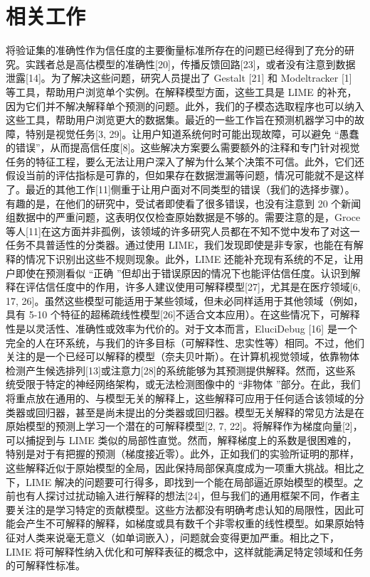 \documentclass[12pt, a4paper]{ctexart} %
\begin{document}
\section{相关工作}
将验证集的准确性作为信任度的主要衡量标准所存在的问题已经得到了充分的研究。实践者总是高估模型的准确性[20]，传播反馈回路[23]，或者没有注意到数据泄露[14]。为了解决这些问题，研究人员提出了 Gestalt [21] 和 Modeltracker [1] 等工具，帮助用户浏览单个实例。在解释模型方面，这些工具是 LIME 的补充，因为它们并不解决解释单个预测的问题。此外，我们的子模态选取程序也可以纳入这些工具，帮助用户浏览更大的数据集。最近的一些工作旨在预测机器学习中的故障，特别是视觉任务[3, 29]。让用户知道系统何时可能出现故障，可以避免 “愚蠢的错误”，从而提高信任度[8]。这些解决方案要么需要额外的注释和专门针对视觉任务的特征工程，要么无法让用户深入了解为什么某个决策不可信。此外，它们还假设当前的评估指标是可靠的，但如果存在数据泄漏等问题，情况可能就不是这样了。最近的其他工作[11]侧重于让用户面对不同类型的错误（我们的选择步骤）。有趣的是，在他们的研究中，受试者即使看了很多错误，也没有注意到 20 个新闻组数据中的严重问题，这表明仅仅检查原始数据是不够的。需要注意的是，Groce 等人[11]在这方面并非孤例，该领域的许多研究人员都在不知不觉中发布了对这一任务不具普适性的分类器。通过使用 LIME，我们发现即使是非专家，也能在有解释的情况下识别出这些不规则现象。此外，LIME 还能补充现有系统的不足，让用户即使在预测看似 “正确 ”但却出于错误原因的情况下也能评估信任度。认识到解释在评估信任度中的作用，许多人建议使用可解释模型[27]，尤其是在医疗领域[6, 17, 26]。虽然这些模型可能适用于某些领域，但未必同样适用于其他领域（例如，具有 5-10 个特征的超稀疏线性模型[26]不适合文本应用）。在这些情况下，可解释性是以灵活性、准确性或效率为代价的。对于文本而言，EluciDebug [16] 是一个完全的人在环系统，与我们的许多目标（可解释性、忠实性等）相同。不过，他们关注的是一个已经可以解释的模型（奈夫贝叶斯）。在计算机视觉领域，依靠物体检测产生候选排列[13]或注意力[28]的系统能够为其预测提供解释。然而，这些系统受限于特定的神经网络架构，或无法检测图像中的 “非物体 ”部分。在此，我们将重点放在通用的、与模型无关的解释上，这些解释可应用于任何适合该领域的分类器或回归器，甚至是尚未提出的分类器或回归器。模型无关解释的常见方法是在原始模型的预测上学习一个潜在的可解释模型[2, 7, 22]。将解释作为梯度向量[2]，可以捕捉到与 LIME 类似的局部性直觉。然而，解释梯度上的系数是很困难的，特别是对于有把握的预测（梯度接近零）。此外，正如我们的实验所证明的那样，这些解释近似于原始模型的全局，因此保持局部保真度成为一项重大挑战。相比之下，LIME 解决的问题要可行得多，即找到一个能在局部逼近原始模型的模型。之前也有人探讨过扰动输入进行解释的想法[24]，但与我们的通用框架不同，作者主要关注的是学习特定的贡献模型。这些方法都没有明确考虑认知的局限性，因此可能会产生不可解释的解释，如梯度或具有数千个非零权重的线性模型。如果原始特征对人类来说毫无意义（如单词嵌入），问题就会变得更加严重。相比之下，LIME 将可解释性纳入优化和可解释表征的概念中，这样就能满足特定领域和任务的可解释性标准。
\end{document}
